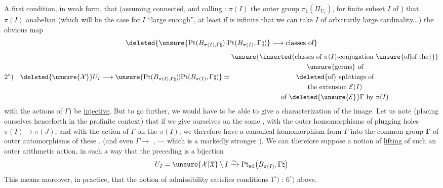 A first condition, in weak form,  that (assuming  connected, and calling : $\pi(I)$ the outer group $\pi_1(\Pi_{U_I})$, for  finite subset $I$ of ) that  $\pi(I)$ anabelian (which will be the case for $I$ ``large enough'',
at least if  is infinite  that we can take $I$ of arbitrarily large cardinality...)  the obvious map
\[
\deleted{\unsure{\mathrm{Pt}(B_{\pi(I),\Gamma\natural})|\mathrm{Pt}(B_{\pi(I)},\Gamma\natural)}\longrightarrow\text{classes of}}
\]
\[
2^\circ)\quad
\deleted{\unsure{\mathcal X}}U_I\longrightarrow
\unsure{\mathrm{Pt}(B_{\pi(I),\Gamma\natural})|\mathrm{Pt}(B_{\pi(I)},\Gamma\natural)}
\simeq
\begin{gathered}
\unsure{\inserted{\text{classes of }\pi(I)\text{-conjugation }\unsure{\text{of}|\text{of the}}}}\\
\unsure{\text{germs}}\text{ of}\\
\deleted{\text{of}}\text{ splittings of}\\
\text{the extension }\mathcal E(I)\\
\text{of }\deleted{\unsure{\mathcal E}}\Gamma\text{ by }\pi(I)
\end{gathered}
\]
 with the actions of $\Gamma$) be \uline{injective}. But to go further, we would have to be able to give a characterization of the image. Let us note (placing ourselves henceforth in the profinite context) that if we give ourselves on the  some ,  with the outer homomorphisms of plugging holes $\pi(I)\longrightarrow\pi(J)$, and with the action of $\Gamma$ on the $\pi(I)$, we therefore have a
canonical homomorphism from $\Gamma$ into the common group  $\boldsymbol{\Gamma}$ of  \unsure{(}outer automorphisms of these .
(and even $\Gamma\longrightarrow$ , --- which is  a markedly stronger ). We can therefore
suppose  a notion of 
\uline{lifting} of such an outer arithmetic
action, in such a way that the
preceding  is a bijection
\[
 U_I=\unsure{\mathcal X|\mathfrak X}\setminus I
 \xrightarrow{\sim}
 \mathrm{Pt}_{\mathrm{ad}}\bigl(B_{\pi(I)},\Gamma\natural\bigr)
\]
This means moreover, in practice,
that the notion of admissibility satisfies
conditions $1^\circ)$ : $6^\circ)$  above.

